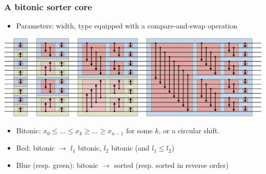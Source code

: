 \documentclass[9pt]{beamer}
\begin{document}
\begin{frame}
  \frametitle{A bitonic sorter core}
  \begin{center}
    \begin{itemize}
    \item Parameters: width, type equipped with a compare-and-swap operation

    \end{itemize}
    \includegraphics[width=\textwidth]{figs/bitonic1.png}
    \begin{itemize}
    \item Bitonic: $x_0 \le \dots \le x_k \ge \dots \ge x_{n-1}$ for
      some $k$, or a circular shift.
    \item Red: bitonic $\to$ $l_1$ bitonic, $l_2$ bitonic (and $l_1
      \le l_2$)
    \item Blue (resp. green): bitonic $\to$ sorted (resp. sorted in
      reverse order)
    \end{itemize}
  \end{center}
\end{frame}
\end{document}
